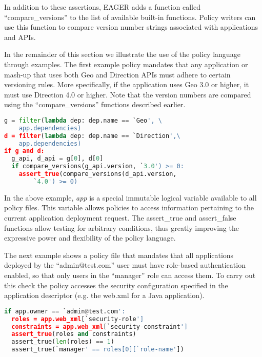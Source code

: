 In addition to these assertions, EAGER adds a function
called ``compare\_versions'' to the list 
of available built-in functions. Policy
writers can use this function to compare version 
number strings associated with
applications and APIs.


In the remainder of this section we illustrate the use of the policy language
through examples.
The first example policy mandates that any application or mash-up
that uses both Geo and Direction APIs must adhere to certain versioning 
rules. More specifically, if the application uses Geo 3.0 or higher, it must use
Direction 4.0 or higher. Note that the version numbers are compared using the
``compare\_versions'' functions described earlier.

\vspace{0.05in}
{\footnotesize
\begin{lstlisting}[language=Python, frame=single, showstringspaces=false]
g = filter(lambda dep: dep.name == `Geo', \
	app.dependencies)
d = filter(lambda dep: dep.name == `Direction',\
	app.dependencies)
if g and d:
  g_api, d_api = g[0], d[0]
  if compare_versions(g_api.version, `3.0') >= 0:
    assert_true(compare_versions(d_api.version, 
    	`4.0') >= 0)
\end{lstlisting}
}
\vspace{0.05in}

In the above example, \textit{app} is a special immutable logical variable available to
all policy files. This variable allows policies to access information
pertaining to the current application deployment request. The assert\_true and assert\_false
functions allow testing for arbitrary conditions, thus greatly improving the expressive
power and flexibility of the policy language.

The next example shows a policy file that mandates that all applications deployed
by the ``admin@test.com'' user must have role-based authentication enabled, so that only
users in the ``manager'' role can access them. To carry out this check the policy accesses
the security configuration specified in the application descriptor (e.g. the
web.xml for a Java application).

\vspace{0.05in}
{\footnotesize
\begin{lstlisting}[language=Python, frame=single, showstringspaces=false]
if app.owner == `admin@test.com':
  roles = app.web_xml[`security-role']
  constraints = app.web_xml[`security-constraint']
  assert_true(roles and constraints)
  assert_true(len(roles) == 1)
  assert_true(`manager' == roles[0][`role-name'])
\end{lstlisting}
}
\vspace{0.05in}

